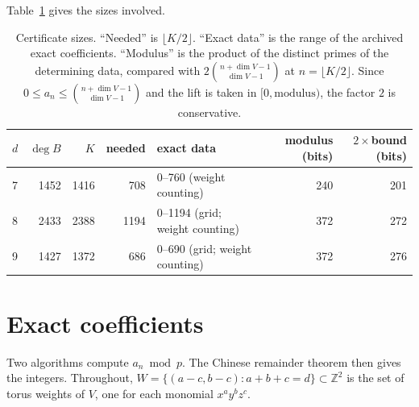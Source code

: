 \documentclass[11pt]{amsart}
\theoremstyle{definition}
\theoremstyle{remark}
\newcommand{\Z}{\mathbb{Z}}
\begin{document}
Table~\ref{tab:sizes} gives the sizes involved.

\begin{table}[h]\small
\caption{Certificate sizes. ``Needed'' is $\lfloor K/2\rfloor$. ``Exact data'' is the range of the archived exact coefficients. ``Modulus'' is the product of the distinct primes of the determining data, compared with $2\binom{n+\dim V-1}{\dim V-1}$ at $n=\lfloor K/2\rfloor$. Since $0\le a_n\le\binom{n+\dim V-1}{\dim V-1}$ and the lift is taken in $[0,\text{modulus})$, the factor $2$ is conservative.}\label{tab:sizes}
\begin{tabular}{@{}lrrrp{}rr@{}}
\toprule
$d$ & $\deg B$ & $K$ & needed & exact data & modulus (bits) & $2\times$bound (bits)\\
\midrule
7 & 1452 & 1416 & 708 & 0--760 (weight counting) & 240 & 201\\
8 & 2433 & 2388 & 1194 & 0--1194 (grid; weight counting) & 372 & 272\\
9 & 1427 & 1372 & 686 & 0--690 (grid; weight counting) & 372 & 276\\
\bottomrule
\end{tabular}
\end{table}

\section{Exact coefficients}\label{sec:coef}

Two algorithms compute $a_n\bmod p$. The Chinese remainder theorem then gives the integers. Throughout, $W=\{(a-c,b-c):a+b+c=d\}\subset\Z^2$ is the set of torus weights of $V$, one for each monomial $x^ay^bz^c$.
\end{document}

